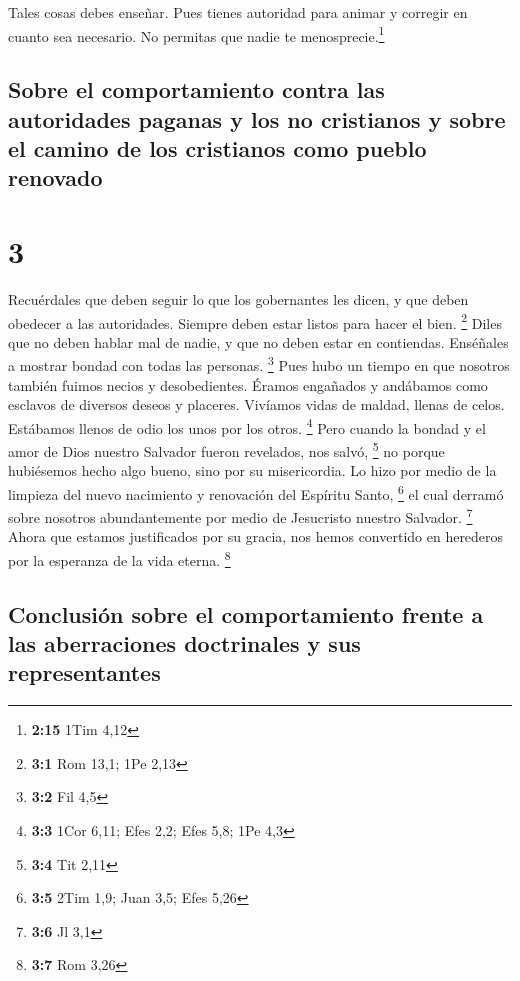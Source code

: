  Tales cosas debes enseñar. Pues tienes autoridad para
animar y corregir en cuanto sea necesario. No permitas que nadie te
menosprecie.\footnote{\textbf{2:15} 1Tim 4,12}

\hypertarget{sobre-el-comportamiento-contra-las-autoridades-paganas-y-los-no-cristianos-y-sobre-el-camino-de-los-cristianos-como-pueblo-renovado}{%
\subsection{Sobre el comportamiento contra las autoridades paganas y los
no cristianos y sobre el camino de los cristianos como pueblo
renovado}\label{sobre-el-comportamiento-contra-las-autoridades-paganas-y-los-no-cristianos-y-sobre-el-camino-de-los-cristianos-como-pueblo-renovado}}

\hypertarget{section-2}{%
\section{3}\label{section-2}}

 Recuérdales que deben seguir lo que los gobernantes les
dicen, y que deben obedecer a las autoridades. Siempre deben estar
listos para hacer el bien. \footnote{\textbf{3:1} Rom 13,1; 1Pe 2,13}
 Diles que no deben hablar mal de nadie, y que no deben
estar en contiendas. Enséñales a mostrar bondad con todas las personas.
\footnote{\textbf{3:2} Fil 4,5}  Pues hubo un tiempo en
que nosotros también fuimos necios y desobedientes. Éramos engañados y
andábamos como esclavos de diversos deseos y placeres. Vivíamos vidas de
maldad, llenas de celos. Estábamos llenos de odio los unos por los
otros. \footnote{\textbf{3:3} 1Cor 6,11; Efes 2,2; Efes 5,8; 1Pe 4,3}
 Pero cuando la bondad y el amor de Dios nuestro Salvador
fueron revelados, nos salvó, \footnote{\textbf{3:4} Tit 2,11}
 no porque hubiésemos hecho algo bueno, sino por su
misericordia. Lo hizo por medio de la limpieza del nuevo nacimiento y
renovación del Espíritu Santo, \footnote{\textbf{3:5} 2Tim 1,9; Juan
  3,5; Efes 5,26}  el cual derramó sobre nosotros
abundantemente por medio de Jesucristo nuestro Salvador. \footnote{\textbf{3:6}
  Jl 3,1}  Ahora que estamos justificados por su gracia,
nos hemos convertido en herederos por la esperanza de la vida eterna.
\footnote{\textbf{3:7} Rom 3,26}

\hypertarget{conclusiuxf3n-sobre-el-comportamiento-frente-a-las-aberraciones-doctrinales-y-sus-representantes}{%
\subsection{Conclusión sobre el comportamiento frente a las aberraciones
doctrinales y sus
representantes}\label{conclusiuxf3n-sobre-el-comportamiento-frente-a-las-aberraciones-doctrinales-y-sus-representantes}}

